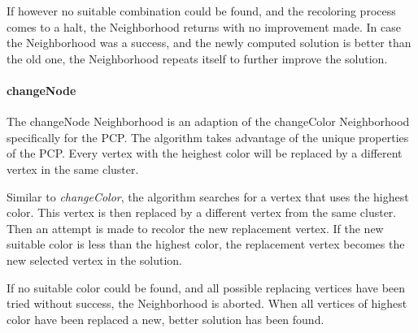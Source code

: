 \documentclass[paper=a4,fontsize=12pt]{scrartcl}
\begin{document}
If however no suitable combination could be found, and the recoloring process comes to a halt, the Neighborhood returns with no improvement made. In case the Neighborhood was a success, and the newly computed solution is better than the old one, the Neighborhood repeats itself to further improve the solution.



\paragraph{changeNode}
The changeNode Neighborhood is an adaption of the changeColor Neighborhood specifically for the PCP. The algorithm takes advantage of the unique properties of the PCP. Every vertex with the heighest color will be replaced by a different vertex in the same cluster.


Similar to \emph{changeColor}, the algorithm searches for a vertex that uses the highest color. This vertex is then replaced by a different vertex from the same cluster. Then an attempt is made to recolor the new replacement vertex. If the new suitable color is less than the highest color, the replacement vertex becomes the new selected vertex in the solution. 


If no suitable color could be found, and all possible replacing vertices have been tried without success, the Neighborhood is aborted. When all vertices of highest color have been replaced a new, better solution has been found.
\end{document}

